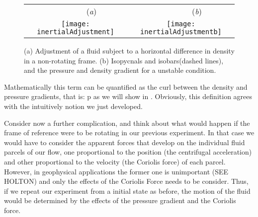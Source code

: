\begin{figure}[t]
\begin{center}
 \begin{tabular}{cc}
        ~~~~~~~~(\textit{a})                        &   ~~~~~~~~(\textit{b}) \\
    \texttt{[image: inertialAdjustment]}
    & \texttt{[image: inertialAdjustmentb]}

  \end{tabular}
\end{center}
\caption{
(a) Adjustment of a fluid subject to a horizontal difference in density in a non-rotating frame.
(b) Isopycnals and isobars(dashed lines), and the pressure and density gradient for a unstable condition.
        }
\label{f:drivedrag}
\end{figure}

Mathematically this term can be quantified as the curl between the density and pressure gradients, that is:
\beq
\nabla \rho \times \nabla p
as we will show in . Obviously, this definition agrees with the intuitively notion we just developed.

Consider now a further complication, and think about what would happen if the frame of reference were to be rotating in our previous experiment. In that case we would have to consider the apparent forces that develop on the individual fluid parcels of our flow, one proportional to the position (the centrifugal acceleration) and other proportional to the velocity (the Coriolis force) of each parcel. However, in geophysical applications the former one is unimportant (SEE HOLTON) and only the effects of the Coriolis Force needs to be consider. Thus, if we repeat our experiment from a initial state as before, the motion of the fluid would be determined by the effects of the pressure gradient and the Coriolis force.

